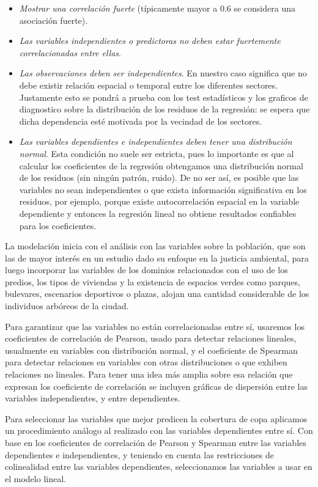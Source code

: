 \documentclass[12pt,]{book}
\providecommand{\tightlist}{%
  \setlength{\itemsep}{0pt}\setlength{\parskip}{0pt}}
\begin{document}
\begin{itemize}
\tightlist
\item
  \emph{Mostrar una correlación fuerte} (típicamente mayor a 0.6 se
  considera una asociación fuerte).
\item
  \emph{Las variables independientes o predictoras no deben estar
  fuertemente correlacionadas entre ellas}.
\item
  \emph{Las observaciones deben ser independientes}. En nuestro caso
  significa que no debe existir relación espacial o temporal entre los
  diferentes sectores. Justamente esto se pondrá a prueba con los test
  estadísticos y los graficos de diagnostico sobre la distribución de
  los residuos de la regresión: se espera que dicha dependencia esté
  motivada por la vecindad de los sectores.
\item
  \emph{Las variables dependientes e independientes deben tener una
  distribución normal}. Esta condición no suele ser estricta, pues lo
  importante es que al calcular los coeficientes de la regresión
  obtengamos una distribución normal de los residuos (sin ningún patrón,
  ruido). De no ser así, es posible que las variables no sean
  independientes o que exista información significativa en los residuos,
  por ejemplo, porque existe autocorrelación espacial en la variable
  dependiente y entonces la regresión lineal no obtiene resultados
  confiables para los coeficientes.
\end{itemize}

La modelación inicia con el análisis con las variables sobre la
población, que son las de mayor interés en un estudio dado su enfoque en
la justicia ambiental, para luego incorporar las variables de los
dominios relacionados con el uso de los predios, los tipos de viviendas
y la existencia de espacios verdes como parques, bulevares, escenarios
deportivos o plazas, alojan una cantidad considerable de los individuos
arbóreos de la ciudad.

Para garantizar que las variables no están correlacionadas entre sí,
usaremos los coeficientes de correlación de Pearson, usado para detectar
relaciones lineales, usualmente en variables con distribución normal, y
el coeficiente de Spearman para detectar relaciones en variables con
otras distribuciones o que exhiben relaciones no lineales. Para tener
una idea más amplia sobre esa relación que expresan los coeficiente de
correlación se incluyen gráficas de dispersión entre las variables
independientes, y entre dependientes.

Para seleccionar las variables que mejor predicen la cobertura de copa
aplicamos un procedimiento análogo al realizado con las variables
dependientes entre sí. Con base en los coeficientes de correlación de
Pearson y Spearman entre las variables dependientes e independientes, y
teniendo en cuenta las restricciones de colinealidad entre las variables
dependientes, seleccionamos las variables a usar en el modelo lineal.
\end{document}
